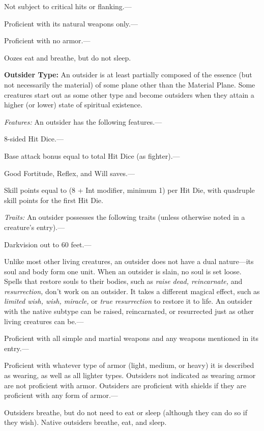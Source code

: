 \documentclass{article}
\begin{document}
Not subject to critical hits or flanking.---

Proficient with its natural weapons only.---

Proficient with no armor.---

Oozes eat and breathe, but do not sleep.

\vspace{12pt}
\textbf{Outsider Type: }An outsider is at least partially composed of the essence 
(but not necessarily the material) of some plane other than the Material Plane. 
Some creatures start out as some other type and become outsiders when they attain 
a higher (or lower) state of spiritual existence.

\textit{Features: }An outsider has the following features.---

8-sided Hit Dice.---

Base attack bonus equal to total Hit Dice (as fighter).---

Good Fortitude, Reflex, and Will saves.---

Skill points equal to (8 + Int modifier, minimum 1) per Hit Die, with quadruple 
skill points for the first Hit Die.

\textit{Traits: }An outsider possesses the following traits (unless otherwise noted 
in a creature's entry).---

Darkvision out to 60 feet.---

Unlike most other living creatures, an outsider does not have a dual nature---its 
soul and body form one unit. When an outsider is slain, no soul is set loose. Spells 
that restore souls to their bodies, such as \textit{raise dead, reincarnate, }and 
\textit{resurrection, }don't work on an outsider. It takes a different magical 
effect, such as \textit{limited wish, wish, miracle, }or \textit{true resurrection 
}to restore it to life. An outsider with the native subtype can be raised, reincarnated, 
or resurrected just as other living creatures can be.---

Proficient with all simple and martial weapons and any weapons mentioned in its 
entry.---

Proficient with whatever type of armor (light, medium, or heavy) it is described 
as wearing, as well as all lighter types. Outsiders not indicated as wearing armor 
are not proficient with armor. Outsiders are proficient with shields if they are 
proficient with any form of armor.---

Outsiders breathe, but do not need to eat or sleep (although they can do so if 
they wish). Native outsiders breathe, eat, and sleep. 
\end{document}
